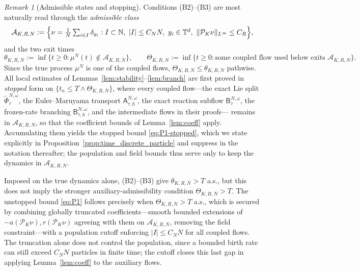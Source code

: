 \documentclass[a4paper,fleqn]{cas-sc}
\theoremstyle{definition}
\theoremstyle{remark}
\newtheorem{remark}[theorem]{Remark}
\begin{document}
\begin{remark}[Admissible states and stopping]\label{rem:admissible}
Conditions (B2)--(B3) are most naturally read through the \emph{admissible class}
\[
\mathcal A_{K,R,N}:=\Bigl\{\nu=\tfrac1N\textstyle\sum_{i\in I}\delta_{y_i}:
I\subset\mathbb N,\ |I|\le C_NN,\ y_i\in\mathbb T^d,\ \|\mathcal P_K\nu\|_{L^\infty}\le C_R\Bigr\},
\]
and the two exit times
\[
\theta_{K,R,N}:=\inf\{t\ge0:\mu^N(t)\notin\mathcal A_{K,R,N}\},\qquad
\Theta_{K,R,N}:=\inf\{t\ge0:\text{some coupled flow used below exits }\mathcal A_{K,R,N}\}.
\]
Since the true process $\mu^N$ is one of the coupled flows,
$\Theta_{K,R,N}\le\theta_{K,R,N}$ pathwise. All local estimates of
Lemmas~\ref{lem:stability}--\ref{lem:branch} are first proved in \emph{stopped}
form on $\{t_n\le T\wedge\Theta_{K,R,N}\}$, where every coupled flow---the exact
Lie split $\widetilde\Phi^{N,\omega}_\tau$, the Euler--Maruyama transport
$\mathsf A^{N,\omega}_{\tau,h}$, the exact reaction subflow
$\mathsf B^{N,\omega}_\tau$, the frozen-rate branching
$\mathsf B^{N,\omega}_{\tau,h}$, and the intermediate flows in their proofs---
remains in $\mathcal A_{K,R,N}$, so that the coefficient bounds of
Lemma~\ref{lem:coeff} apply. Accumulating them yields the stopped bound
\eqref{eq:P1-stopped}, which we state explicitly in
Proposition~\ref{prop:time_discrete_particle} and suppress in the notation
thereafter; the population and field bounds thus serve only to keep the dynamics
in $\mathcal A_{K,R,N}$.

Imposed on the true dynamics alone, (B2)--(B3) give $\theta_{K,R,N}>T$ a.s., but
this does not imply the stronger auxiliary-admissibility condition
$\Theta_{K,R,N}>T$. The unstopped bound \eqref{eq:P1} follows precisely when
$\Theta_{K,R,N}>T$ a.s., which is secured by combining globally truncated
coefficients---smooth bounded extensions of $-a(\mathcal P_K\nu),
r(\mathcal P_K\nu)$ agreeing with them on $\mathcal A_{K,R,N}$, removing the
field constraint---with a population cutoff enforcing $|I|\le C_NN$ for all coupled
flows. The truncation alone does not control the population, since a bounded birth
rate can still exceed $C_NN$ particles in finite time; the cutoff closes this last
gap in applying Lemma~\ref{lem:coeff} to the auxiliary flows.
\end{remark}
\end{document}
